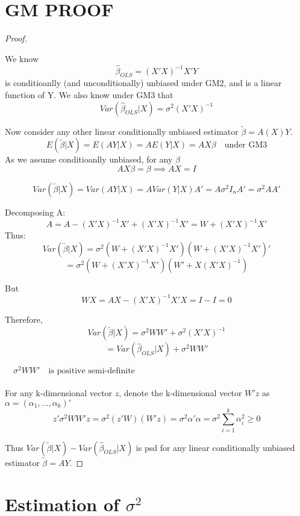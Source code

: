 \documentclass[DIV=14,titlepage=false]{scrreprt}
\begin{document}
\newpage

\section{GM PROOF}

\vspace{5mm}

\begin{proof}
\vspace{5mm}
\begin{lemma}
We know \[\hat{\beta}_{OLS}=(X'X)^{-1}X'Y\] is conditioanlly (and unconditionally) unbiased under GM2, and is a linear function of Y.
We also know under GM3 that \[Var(\hat{\beta}_{OLS}|X)=\sigma^2(X'X)^{-1}\]
\end{lemma}
Now consider any other linear conditionally unbiased estimator \(\tilde{\beta}=A(X)Y\).
\[E(\tilde{\beta}|X)=E(AY|X)=AE(Y|X)=AX\beta \quad \text{under GM3}\]
As we assume conditioanlly unbiased, for any \(\beta\)
\[AX\beta=\beta \implies AX=I\]
\begin{lemma}
    \[Var(\tilde{\beta}|X)=Var(AY|X)=AVar(Y|X)A'=A\sigma^2I_nA'=\sigma^2AA'\]
\end{lemma}

Decomposing A:
\[A=A-(X'X)^{-1}X'+(X'X)^{-1}X'=W+(X'X)^{-1}X'\]
Thus: \[Var(\tilde{\beta}|X)=\sigma^2(W+(X'X)^{-1}X')(W+(X'X)^{-1}X')'\]
\[=\sigma^2(W+(X'X)^{-1}X')(W'+X(X'X)^{-1})\]

But \[WX=AX-(X'X)^{-1}X'X=I-I=0\]

Therefore,
\[Var(\tilde{\beta}|X)=\sigma^2WW'+\sigma^2(X'X)^{-1}\]
\[= Var(\hat{\beta}_{OLS}|X)+\sigma^2WW'\]

\begin{lemma}
    \(\quad \sigma^2WW' \quad \text{is positive semi-definite}\)
    \\
    \\
    For any k-dimensional vector \(z\), denote the k-dimensional vector \(W'z\) as \(\alpha=(\alpha_1,...,\alpha_k)'\)
    \[z'\sigma^2WW'z=\sigma^2(z'W)(W'z)=\sigma^2\alpha'\alpha=\sigma^2\sum_{i=1}^k\alpha_i^2\geq0\]

\end{lemma}

Thus \(Var(\tilde{\beta}|X) - Var(\hat{\beta}_{OLS}|X)\) is psd for any linear conditionally unbiased estimator \(\tilde{\beta}=AY\).

\end{proof}

\newpage

\section{Estimation of \(\sigma^2\)}
\end{document}
